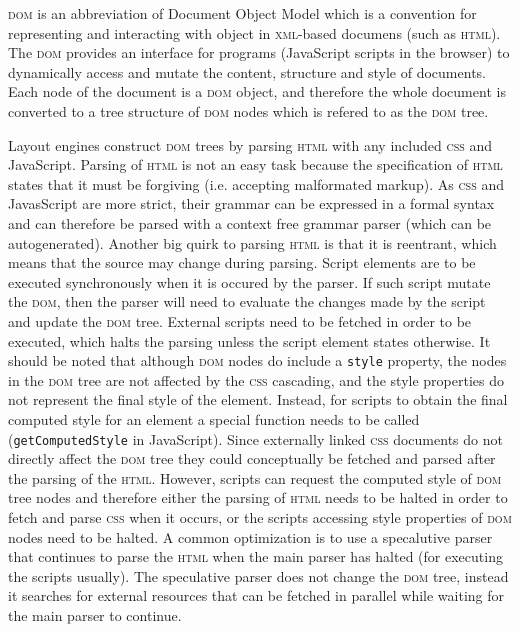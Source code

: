 \documentclass[a4paper,11pt]{kth-mag}
\newcommand{\code}[1]{\texttt{#1}}
\begin{document}
        \textsc{dom} is an abbreviation of Document Object Model which is a convention for representing and interacting with object in \textsc{xml}-based documens (such as \textsc{html}).
        The \textsc{dom} provides an interface for programs (JavaScript scripts in the browser) to dynamically access and mutate the content, structure and style of documents.
        Each node of the document is a \textsc{dom} object, and therefore the whole document is converted to a tree structure of \textsc{dom} nodes which is refered to as the \textsc{dom} tree.

        Layout engines construct \textsc{dom} trees by parsing \textsc{html} with any included \textsc{css} and JavaScript.
        Parsing of \textsc{html} is not an easy task because the specification of \textsc{html} states that it must be forgiving (i.e. accepting malformated markup).
        As \textsc{css} and JavasScript are more strict, their grammar can be expressed in a formal syntax and can therefore be parsed with a context free grammar parser (which can be autogenerated).
        Another big quirk to parsing \textsc{html} is that it is reentrant, which means that the source may change during parsing.
        Script elements are to be executed synchronously when it is occured by the parser.
        If such script mutate the \textsc{dom}, then the parser will need to evaluate the changes made by the script and update the \textsc{dom} tree.
        External scripts need to be fetched in order to be executed, which halts the parsing unless the script element states otherwise.
        It should be noted that although \textsc{dom} nodes do include a \code{style} property, the nodes in the \textsc{dom} tree are not affected by the \textsc{css} cascading, and the style properties do not represent the final style of the element.
        Instead, for scripts to obtain the final computed style for an element a special function needs to be called (\code{getComputedStyle} in JavaScript).
        Since externally linked \textsc{css} documents do not directly affect the \textsc{dom} tree they could conceptually be fetched and parsed after the parsing of the \textsc{html}.
        However, scripts can request the computed style of \textsc{dom} tree nodes and therefore either the parsing of \textsc{html} needs to be halted in order to fetch and parse \textsc{css} when it occurs, or the scripts accessing style properties of \textsc{dom} nodes need to be halted.
        A common optimization is to use a specalutive parser that continues to parse the \textsc{html} when the main parser has halted (for executing the scripts usually).
        The speculative parser does not change the \textsc{dom} tree, instead it searches for external resources that can be fetched in parallel while waiting for the main parser to continue.
\end{document}
